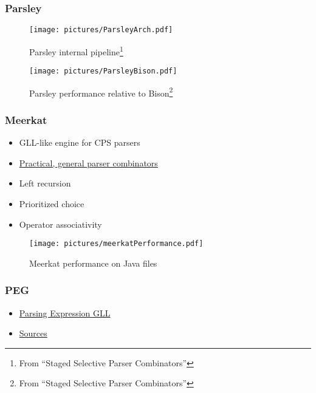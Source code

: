 \documentclass[xcolor=table,aspectratio=169]{beamer}
\begin{document}
\begin{frame}[fragile]
  \frametitle{Parsley}  
  \begin{figure}
    \texttt{[image: pictures/ParsleyArch.pdf]}
    \caption{Parsley internal pipeline\footnote{From ``Staged Selective Parser Combinators''}}  
  \end{figure}
  \pause
  \begin{figure}
    \texttt{[image: pictures/ParsleyBison.pdf]}
    \caption{Parsley performance relative to Bison\footnote{From ``Staged Selective Parser Combinators''}}  
  \end{figure}
\end{frame}

\begin{frame}[fragile]
  \frametitle{Meerkat}
  \begin{minipage}[t]{0.4\textwidth}
  \begin{itemize}
    \item GLL-like engine for CPS parsers
    \item \href{https://dl.acm.org/doi/10.1145/2847538.2847539}{Practical, general parser combinators}
    \pause
    \item[\faPlus] Left recursion
    \item[\faPlus] Prioritized choice
    \item[\faPlus] Operator associativity 
  \end{itemize} 
\end{minipage}  
  \begin{minipage}[t]{0.58\textwidth}
    \begin{figure}
      \texttt{[image: pictures/meerkatPerformance.pdf]}
      \caption{Meerkat performance on Java files\footnotemark}
    \end{figure}
  \end{minipage}  
\end{frame}

\begin{frame}[fragile]
  \frametitle{PEG}  
  \begin{itemize}
    \item \href{https://arxiv.org/pdf/2205.04600.pdf}{Parsing Expression GLL}
    \item \href{https://github.com/bruceiv/pegll}{Sources}
  \end{itemize}
\end{frame}
\end{document}

